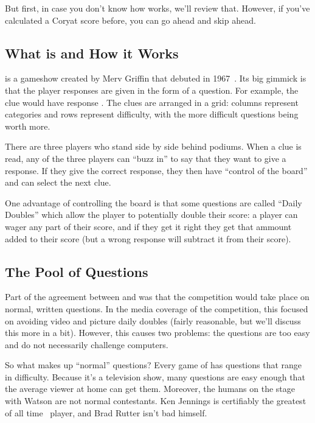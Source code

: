 But first, in case you don't know how \jeopardy{} works, we'll review
that.
%
However, if you've calculated a Coryat score before, you can go ahead
and skip ahead.

\subsection{What \jeopardy{} is and How it Works}

\jeopardy{} is a gameshow created by Merv Griffin that debuted in 1967~\citep{griffin-03}.
%
Its big gimmick is that the player responses are given in the form of
a question.
%
For example, the clue
would have response .
%
%
The clues are arranged in a grid: columns represent categories and
rows represent difficulty, with the more difficult questions being
worth more.

There are three players who stand side by side behind podiums.
%
When a clue is read, any of the three players can ``buzz in'' to say
that they want to give a response.
%
If they give the correct response, they then have ``control of the
board'' and can select the next clue.

One advantage of controlling the board is that some questions are
called ``Daily Doubles'' which allow the player to potentially double
their score: a player can wager any part of their score, and if they
get it right they get that ammount added to their score (but a wrong
response will subtract it from their score).

\subsection{The Pool of Questions}


Part of the agreement between \jeopardy{} and  was that the
competition would take place on normal, written questions.
%
In the media coverage of the competition, this focused on avoiding
video and picture daily doubles (fairly reasonable, but we'll discuss
this more in a bit).
%
However, this causes two problems: the questions are too easy and do
not necessarily challenge computers.

So what makes up ``normal'' questions?
%
Every game of \jeopardy{} has questions that range in difficulty.
%
Because it's a television show, many questions are easy enough that
the average viewer at home can get them.
%
Moreover, the humans on the stage with Watson are not normal contestants.
%
Ken Jennings is certifiably the greatest of all
time~\citep[]{low-20} \jeopardy{} player, and Brad Rutter
isn't bad himself.

